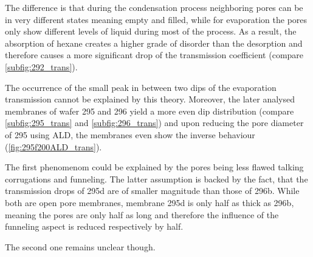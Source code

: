 \documentclass[../thesis.tex]{subfiles}
\begin{document}
                The difference is that during the condensation process neighboring pores can be in very different states meaning empty and filled, while for evaporation the pores only show different levels of liquid during most of the process. As a result, the absorption of hexane creates a higher grade of disorder than the desorption and therefore causes a more significant drop of the transmission coefficient (compare \cref{subfig:292_trans}).
                \medskip

                The occurrence of the small peak in between two dips of the evaporation transmission cannot be explained by this theory. Moreover, the later analysed membranes of wafer 295 and 296 yield a more even dip distribution (compare \cref{subfig:295_trans} and \cref{subfig:296_trans}) and upon reducing the pore diameter of 295 using ALD, the membranes even show the inverse behaviour (\cref{fig:295f200ALD_trans}).

                The first phenomenom could be explained by the pores being less flawed talking corrugations and funneling. The latter assumption is backed by the fact, that the transmission drops of 295d are of smaller magnitude than those of 296b. While both are open pore membranes, membrane 295d is only half as thick as 296b, meaning the pores are only half as long and therefore the influence of the funneling aspect is reduced respectively by half.

                The second one remains unclear though.

                
\end{document}
